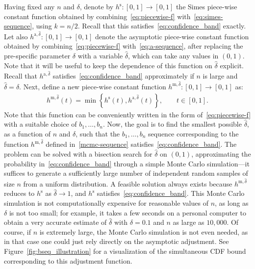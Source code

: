Having fixed any $n$ and $\delta$, denote by $h^{\mathrm{s}}: [0,1] \to [0,1]$ the Simes piece-wise constant function obtained by combining~\eqref{eq:piecewise-f} with~\eqref{eq:simes-sequence}, using $k=n/2$. Recall that this satisfies~\eqref{eq:confidence_band} exactly.
Let also $h^{\mathrm{a},\hat{\delta}}: [0,1] \to [0,1]$ denote the asymptotic piece-wise constant function obtained by combining~\eqref{eq:piecewise-f} with~\eqref{eq:a-sequence}, after replacing the pre-specific parameter $\delta$ with a variable $\hat{\delta}$, which can take any values in $(0,1)$. Note that it will be useful to keep the dependence of this function on $\hat{\delta}$ explicit.
Recall that $h^{\mathrm{a},\hat{\delta}}$ satisfies~\eqref{eq:confidence_band} approximately if $n$ is large and $\hat{\delta} = \delta$.
Next, define a new piece-wise constant function $h^{\mathrm{m},\hat{\delta}}: [0,1] \to [0,1]$ as:
\begin{align} \label{mcmc-sequence}
  h^{\mathrm{m},\hat{\delta}}(t) = \min \left\{ h^{\mathrm{s}}(t), h^{\mathrm{a},\hat{\delta}}(t)\right\},  \qquad t\in [0, 1].
\end{align}
Note that this function can be conveniently written in the form of~\eqref{eq:piecewise-f} with a suitable choice of $b_1,\ldots,b_n$.
Now, the goal is to find the smallest possible $\hat{\delta}$, as a function of $n$ and $\delta$, such that the $b_1,\ldots,b_n$ sequence corresponding to the function $h^{\mathrm{m},\hat{\delta}}$ defined in~\eqref{mcmc-sequence} satisfies~\eqref{eq:confidence_band}. The problem can be solved with a bisection search for $\hat{\delta}$ on $(0,1)$, approximating the probability in~\eqref{eq:confidence_band} through a simple Monte Carlo simulation---it suffices to generate a sufficiently large number of independent random samples of size $n$ from a uniform distribution. A feasible solution always exists because $h^{\mathrm{m},\hat{\delta}}$ reduces to $h^{\mathrm{s}}$ as $\hat{\delta} \to 1$, and $h^{\mathrm{s}}$ satisfies~\eqref{eq:confidence_band}. This Monte Carlo simulation is not computationally expensive for reasonable values of $n$, as long as $\delta$ is not too small; for example, it takes a few seconds on a personal computer to obtain a very accurate estimate of $\hat{\delta}$ with $\delta=0.1$ and $n$ as large as $10,000$. Of course, if $n$ is extremely large, the Monte Carlo simulation is not even needed, as in that case one could just rely directly on the asymptotic adjustment.
See Figure~\ref{fig:bseq_illustration} for a visualization of the simultaneous CDF bound corresponding to this adjustment function.

